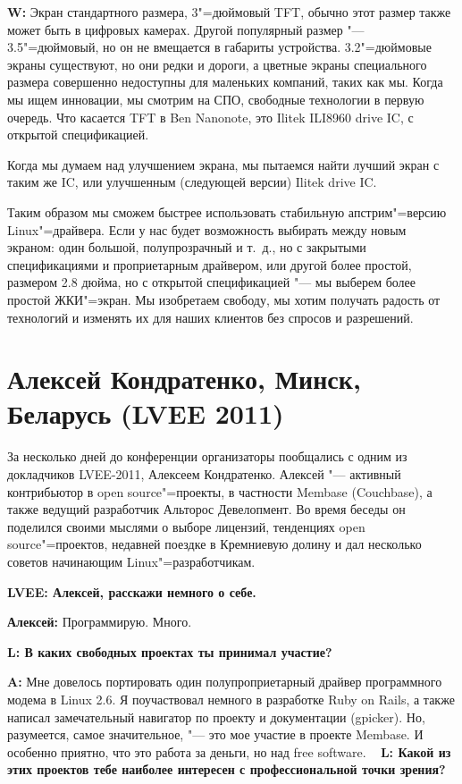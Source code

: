 \documentclass[10pt, a5paper]{article}
\begin{document}
{\noindent \bf W:} Экран стандартного размера, 3"=дюймовый TFT, обычно этот размер также может быть в цифровых камерах. Другой популярный размер "--- 3.5"=дюймовый, но он не вмещается в габариты устройства. 3.2"=дюймовые экраны существуют, но они редки и дороги, а цветные экраны специального размера совершенно недоступны для маленьких компаний, таких как мы. Когда мы ищем инновации, мы смотрим на СПО, свободные технологии в первую очередь. Что касается TFT в Ben Nanonote, это Ilitek ILI8960 drive IC, с открытой спецификацией.

Когда мы думаем над улучшением экрана, мы пытаемся найти лучший экран с таким же IC, или улучшенным (следующей версии) Ilitek drive IC.

Таким образом мы сможем быстрее использовать стабильную апстрим"=версию Linux"=драйвера. Если у нас будет возможность выбирать между новым экраном: один большой, полупрозрачный и т.~д., но с закрытыми спецификациями и проприетарным драйвером, или другой более простой, размером 2.8 дюйма, но с открытой спецификацией "--- мы выберем более простой ЖКИ"=экран. Мы изобретаем свободу, мы хотим получать радость от технологий и изменять их для наших клиентов без спросов и разрешений.

\section{Алексей Кондратенко, Минск, Беларусь (LVEE 2011)}


За несколько дней до конференции организаторы пообщались с одним из докладчиков LVEE-2011, Алексеем Кондратенко. Алексей "--- активный контрибьютор в open source"=проекты, в частности Membase (Couchbase), а также ведущий разработчик Альторос Девелопмент. Во время беседы он поделился своими мыслями о выборе лицензий, тенденциях open source"=проектов, недавней поездке в Кремниевую долину и дал несколько советов начинающим Linux"=разработчикам.

{\noindent \bf LVEE: Алексей, расскажи немного о себе.}

{\noindent \bf Алексей:} Программирую. Много.

{\noindent \bf L:  В каких свободных проектах ты принимал участие?}

{\noindent \bf A:} Мне довелось портировать один полупроприетарный драйвер программного модема в Linux 2.6. Я поучаствовал немного в разработке Ruby on Rails, а также написал замечательный навигатор по проекту и документации (gpicker). Но, разумеется, самое значительное, "--- это  мое участие в проекте Membase. И особенно приятно, что это работа за деньги, но над free software.
 
{\noindent \bf L:  Какой из этих проектов тебе наиболее интересен с профессиональной точки зрения?}
\end{document}

